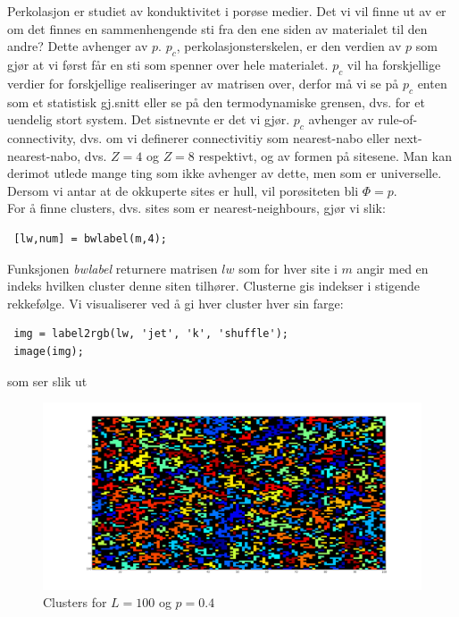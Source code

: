 \documentclass[english, a4paper]{article}
\begin{document}
\noindent
Perkolasjon er studiet av konduktivitet i porøse medier. Det vi vil finne ut av er om det finnes en sammenhengende
sti fra den ene siden av materialet til den andre? Dette avhenger av $p$. $p_c$, perkolasjonsterskelen, er den 
verdien av $p$ som gjør at vi først får en sti som spenner over hele materialet. $p_c$ vil ha forskjellige verdier
for forskjellige realiseringer av matrisen over, derfor må vi se på $p_c$ enten som et statistisk gj.snitt 
eller se på den termodynamiske grensen, dvs. for et uendelig stort system. Det sistnevnte er det vi gjør. 
$p_c$ avhenger av rule-of-connectivity, dvs. om vi definerer connectivitiy som nearest-nabo eller
next-nearest-nabo, dvs. $Z=4$ og $Z=8$ respektivt, og av formen på sitesene. Man kan derimot utlede
mange ting som ikke avhenger av dette, men som er universelle. Dersom vi antar at de okkuperte sites
er hull, vil porøsiteten bli $\Phi = p$. \\

\noindent
For å finne clusters, dvs. sites som er nearest-neighbours, gjør vi slik:
\begin{lstlisting}
 [lw,num] = bwlabel(m,4);
\end{lstlisting}
Funksjonen \textit{bwlabel} returnere matrisen $lw$ som for hver site i $m$ angir med en indeks hvilken 
cluster denne siten tilhører. Clusterne gis indekser i stigende rekkefølge. Vi visualiserer
ved å gi hver cluster hver sin farge:
\begin{lstlisting}
 img = label2rgb(lw, 'jet', 'k', 'shuffle');
 image(img);
\end{lstlisting}
som ser slik ut
\begin{figure}[H]
  \begin{center}
  \includegraphics[width = 140mm]{../Figures/clusters100x100.png}
  \caption{Clusters for $L=100$ og $p=0.4$}
  \label{fig:fig7}
  \end{center}
\end{figure}
\end{document}
